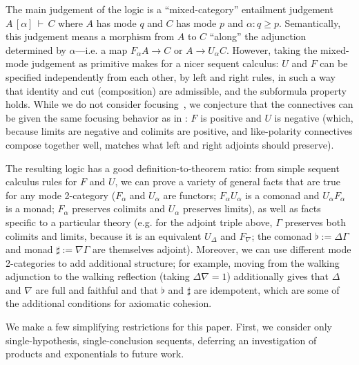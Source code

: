 \documentclass{drl-common/llncs}
\newcommand\seq[3]{\ensuremath{#1 \, [ #2 ] \, \vdash \, #3}}
\begin{document}
The main judgement of the logic is a ``mixed-category'' entailment
judgement \seq{A}{\alpha}{C} where $A$ has mode $q$ and $C$ has mode $p$
and $\alpha : q \ge p$.  Semantically, this judgement means a morphism
from $A$ to $C$ ``along'' the adjunction determined by $\alpha$---i.e. a
map $F_\alpha A \to C$ or $A \to U_\alpha C$.
However, taking the mixed-mode judgement as
primitive makes for a nicer sequent calculus: $U$ and $F$ can be
specified independently from each other, by left and right rules, in
such a way that identity and cut (composition) are admissible, and the
subformula property holds.  While we do not consider
focusing~\citep{andreoli92focus}, we conjecture that the connectives can
be given the same focusing behavior as in \citep{reed09adjoint}: $F$ is
positive and $U$ is negative (which, because limits are negative and
colimits are positive, and like-polarity connectives compose together
well, matches what left and right adjoints should preserve).

The resulting logic has a good definition-to-theorem ratio: from 
simple sequent calculus rules for $F$ and $U$, we can prove a variety of
general facts that are true for any mode 2-category ($F_\alpha$ and
$U_\alpha$ are functors; $F_\alpha U_\alpha$ is a comonad and $U_\alpha
F_\alpha$ is a monad; $F_\alpha$ preserves colimits and $U_\alpha$
preserves limits), as well as facts specific to a particular theory
(e.g. for the adjoint triple above, $\Gamma$ preserves both colimits
and limits, because it is an equivalent $U_\Delta$ and $F_\nabla$; the
comonad $\flat := \Delta\Gamma$ and monad $\sharp := \nabla\Gamma$ are
themselves adjoint).  Moreover, we can use different mode 2-categories
to add additional structure; for example, moving from the walking
adjunction to the walking reflection (taking $\Delta \nabla = 1$)
additionally gives that $\Delta$ and $\nabla$ are full and faithful and
that $\flat$ and $\sharp$ are idempotent, which are some of the
additional conditions for axiomatic cohesion.

We make a few simplifying restrictions for this paper. First, we
consider only single-hypothesis, single-conclusion sequents, deferring
an investigation of products and exponentials to future work.
\end{document}

